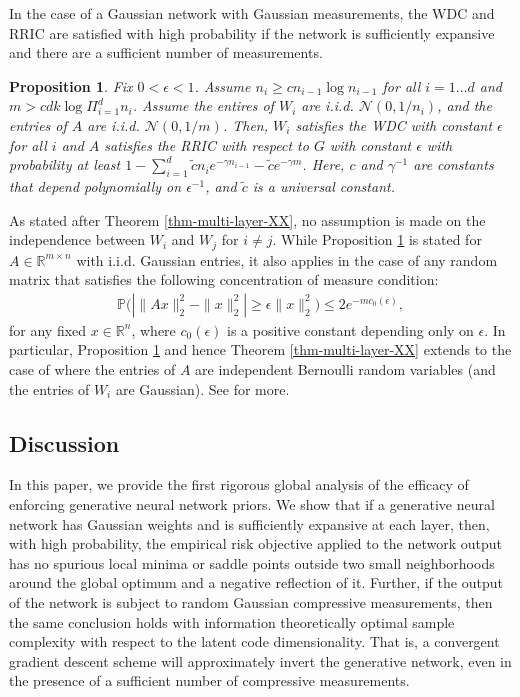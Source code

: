 \documentclass[11pt]{article}
\newtheorem{proposition}[theorem]{Proposition}
\newcommand{\ctilde}{\tilde{c}}
\newcommand{\R}{\mathbb{R}}
\newcommand{\eps}{\epsilon}
\newcommand{\PP}{\mathbb{P}}
\begin{document}
In the case of a Gaussian network with Gaussian measurements, the WDC and RRIC are satisfied with high probability if the network is sufficiently expansive and there are a sufficient number of measurements. 
\begin{proposition} \label{thm-multi-layer}
Fix $0 < \eps < 1$.  Assume $n_i \geq c n_{i-1} \log n_{i-1}$ for all $i = 1 \ldots d$ and $m > c d  k \log \Pi_{i=1}^d n_i$.  Assume the entires of $W_i$ are i.i.d. $\mathcal{N}(0, 1/n_i)$, and the entries of $A$ are i.i.d. $\mathcal{N}(0, 1/m)$.  
Then, $W_i$ satisfies the WDC with constant $\eps$ for all $i$ and $A$ satisfies the RRIC with respect to $G$  with constant $\eps$ with probability at least $1 -  \sum_{i=1}^d \ctilde n_i e^{-\gamma n_{i-1} }- \ctilde e^{-\gamma m}$.  Here, $c$ and $\gamma^{-1}$ are constants that depend polynomially on $\eps^{-1}$, and $\ctilde$ is a universal constant.
\end{proposition}
As stated after Theorem \ref{thm-multi-layer-XX}, no assumption is made on the independence between $W_i$ and $W_j$ for $i \neq j$.
While Proposition \ref{thm-multi-layer} is stated for $A \in \R^{m \times n}$ with i.i.d. Gaussian entries, it also applies in the case of any random matrix that satisfies the following concentration of measure condition:
\begin{align*}
\PP \bigl(| \|Ax\|_2^2  -  \|x\|_2^{2} | \geq \epsilon \|x\|_2^2 \bigr) \leq 2 e^{-m c_0(\epsilon)},
\end{align*}
for any fixed $x \in \R^n$, where $c_0(\epsilon)$ is a positive constant depending only on $\epsilon$.   In particular, Proposition \ref{thm-multi-layer} and hence Theorem \ref{thm-multi-layer-XX} extends to the case of where the entries of $A$ are independent Bernoulli random variables (and the entries of $W_i$ are Gaussian).  See \cite{Baraniuk2008} for more.  


\subsection{Discussion}

In this paper, we provide the first rigorous global analysis of the efficacy of enforcing generative neural network priors.  
We show that if a generative neural network has Gaussian weights and is sufficiently expansive at each layer, then, with high probability, the empirical risk objective applied to the network output has no spurious local minima or saddle points outside two small neighborhoods around the global optimum and a negative reflection of it.  Further, if the output of the network is subject to random Gaussian compressive measurements, then the same conclusion holds with information theoretically optimal sample complexity with respect to the latent code dimensionality.  That is, a convergent gradient descent scheme will approximately invert the generative network, even in the presence of a sufficient number of compressive measurements.  
  
\end{document}
